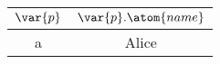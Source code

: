 \begin{tabular}{|c|c|}
	\hline
	$\var{p}$ & $\var{p}.\atom{name}$ \\ \hline
	a & Alice \\ \hline
\end{tabular}
